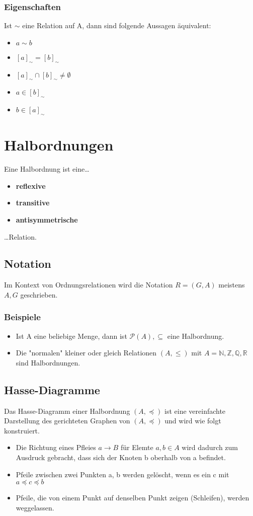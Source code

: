 \subsubsection{Eigenschaften}
Ist $\sim$ eine Relation auf A, dann sind folgende Aussagen äquivalent:
\begin{itemize}
    \item $a \sim b$
    \item $[a]_{\sim} = [b]_{\sim}$
    \item $[a]_{\sim} \cap [b]_{\sim} \neq \emptyset$
    \item $a \in [b]_{\sim}$
    \item $b \in [a]_{\sim}$
\end{itemize}
\section{Halbordnungen}
Eine Halbordnung ist eine\dots
\begin{itemize}
    \item \textbf{reflexive}
    \item \textbf{transitive}
    \item \textbf{antisymmetrische}
\end{itemize}
\dots Relation.
\subsection{Notation}
Im Kontext von Ordnungsrelationen wird die Notation $R = (G,A)$ meistens $A,G$ geschrieben.
\subsubsection{Beispiele}
\begin{itemize}
    \item Ist A eine beliebige Menge, dann ist $\mathcal{P}(A),\subseteq$ eine Halbordnung.
    \item Die "normalen" kleiner oder gleich Relationen $(A,\leq)$ mit $A=\mathbb{N,Z,Q,R}$ sind Halbordnungen.
\end{itemize}
\subsection{Hasse-Diagramme}
Das Hasse-Diagramm einer Halbordnung $(A, \preceq)$ ist eine
vereinfachte Darstellung des gerichteten Graphen von $(A, \preceq)$ und
wird wie folgt konstruiert.
\begin{itemize}
    \item Die Richtung eines Pfleies $a \rightarrow B$ für Elemte $a,b \in A$ wird 
    dadurch zum Ausdruck gebracht, dass sich der Knoten b oberhalb von a befindet.
    \item Pfeile zwischen zwei Punkten a, b werden gelöscht, wenn es ein
    c mit $a \preceq c \preceq b$
    \item Pfeile, die von einem Punkt auf denselben Punkt zeigen (Schleifen), werden weggelassen.
\end{itemize}
